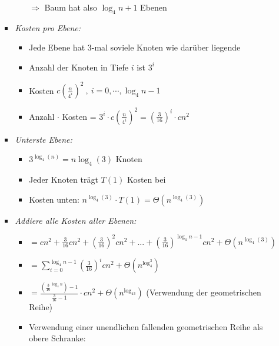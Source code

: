 \documentclass[
    12pt,
    a4paper,
    ngerman,
    color=3b,%
    marginpar=false,
    colorback=false,
    leqno,
]{tudaexercise}
\begin{document}
\begin{itemize}
\begin{itemize}
\begin{itemize}
\begin{itemize}
                                        $\Rightarrow$ Baum hat also $\log_4n + 1$ Ebenen
                              \end{itemize}
                        \item \textit{Kosten pro Ebene:}
                              \begin{itemize}
                                  \item Jede Ebene hat 3-mal soviele Knoten wie darüber liegende
                                  \item Anzahl der Knoten in Tiefe $i$ ist $3^i$
                                  \item Kosten $c(\frac{n}{4^i})^2~,~i=0,\cdots, \log_4n-1$
                                  \item Anzahl $\cdot$ Kosten = $3^i \cdot c(\frac{n}{4^i})^2 = (\frac{3}{16})^i \cdot cn^2$
                              \end{itemize}
                        \item \textit{Unterste Ebene:}
                              \begin{itemize}
                                  \item $3^{\log_4(n)} = n  {\log_4(3)}$ Knoten
                                  \item Jeder Knoten trägt $T(1)$ Kosten bei
                                  \item Kosten unten: $n^{\log_4(3)} \cdot T(1) = \Theta(n^{\log_4(3)})$
                              \end{itemize}
                        \item \textit{Addiere alle Kosten aller Ebenen:}
                              \begin{itemize}
                                  \item {} $= cn^2 + \frac{3}{16}cn^2 + (\frac{3}{16})^2cn^2+...+ (\frac{3}{16})^{\log_4n-1}cn^2 + \Theta(n^{\log_4(3)})$
                                  \item[] {\makebox[0.75cm][l]{}} $= \sum^{\log_4n-1}_{i=0} (\frac{3}{16})^icn^2+ \Theta(n^{\log_4^3})$
                                  \item[] {\makebox[0.75cm][l]{}} $= \frac{(\frac{3}{16}^{\log_4n})-1}{\frac{3}{16}-1} \cdot cn^2 + \Theta(n^{\log_43})$ (Verwendung der geometrischen Reihe)
                                  \item Verwendung einer unendlichen fallenden geometrischen Reihe als obere Schranke:

\end{itemize}
\end{itemize}
\end{itemize}
\end{itemize}
\end{document}
